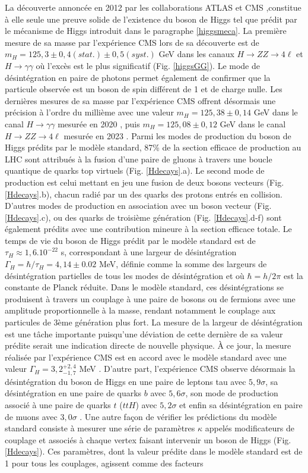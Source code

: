 La découverte annoncée en 2012 par les collaborations ATLAS et CMS \cite{CMSdiscovery,ATLASdiscovery},constitue à elle seule une preuve solide de l'existence du boson de Higgs tel que prédit par le mécanisme de Higgs introduit dans le paragraphe \ref{higgsmeca}. La première mesure de sa masse par l'expérience CMS lors de sa découverte est de $m_{H}=125,3\pm0,4(stat.)\pm0,5(syst.)$ GeV dans les canaux $H\rightarrow ZZ\rightarrow 4\ell$ et $H\rightarrow \gamma\gamma$ où l'excès est le plus significatif (Fig. \ref{higgsGG}). Le mode de désintégration en paire de photons permet également de confirmer que la particule observée est un boson de spin différent de 1 et de charge nulle. Les dernières mesures de sa masse par l'expérience CMS offrent désormais une précision à l'ordre du millième avec une valeur $m_{H}=125,38\pm0,14$ GeV dans le canal $H\to\gamma\gamma$ mesurée en 2020 \cite{HiggsMass2020}, puis $m_{H}=125,08\pm0,12$ GeV dans le canal $H\to ZZ\to 4\ell$ mesurée en 2023 \cite{HiggsMass2023}. Parmi les modes de production du boson de Higgs prédits par le modèle standard, 87\% de la section efficace de production au LHC sont attribués à la fusion d'une paire de gluons à travers une boucle quantique de quarks top virtuels (Fig. \ref{Hdecays}.a). Le second mode de production est celui mettant en jeu une fusion de deux bosons vecteurs (Fig. \ref{Hdecays}.b), chacun radié par un des quarks des protons entrés en collision. D'autres modes de production en association avec un boson vecteur (Fig. \ref{Hdecays}.c), ou des quarks de troisième génération (Fig. \ref{Hdecays}.d-f) sont également prédits avec une contribution mineure à la section efficace totale. Le temps de vie du boson de Higgs prédit par le modèle standard est de $\tau_H\approx1,6.10^{-22}$ s, correspondant à une largeur de désintégration $\Gamma_{H}=\hbar/\tau_{H}=4,14\pm0.02$ MeV, définie comme la somme des largeurs de désintégration partielles de tous les modes de désintégration et où $\hbar=h/2\pi$ est la constante de Planck réduite. Dans le modèle standard, ces désintégrations se produisent à travers un couplage à une paire de bosons ou de fermions avec une amplitude proportionnelle à la masse, rendant notamment le couplage aux particules de 3ème génération plus fort. La mesure de la largeur de désintégration est une tâche importante puisqu'une déviation de cette dernière de sa valeur prédite serait une indication directe de nouvelle physique. À ce jour, la mesure réalisée par l'expérience CMS est en accord avec le modèle standard avec une valeur $\Gamma_{H}=3,2^{+2,4}_{-1,7}$ MeV \cite{HiggsWidth2022}. D'autre part, l'expérience CMS observe désormais la désintégration du boson de Higgs en une paire de leptons tau avec $5,9\sigma$, sa désintégration en une paire de quarks $b$ avec $5,6\sigma$, son mode de production associé à une paire de quarks $t$ ($ttH$) avec $5,2\sigma$ et enfin sa désintégration en paire de muons avec $3,0\sigma$ \cite{higgs10years}. Une autre façon de vérifier les prédictions du modèle standard consiste à mesurer une série de paramètres $\kappa$ appelés modificateurs de couplage et associés à chaque vertex faisant intervenir un boson de Higgs (Fig. \ref{Hdecays}). Ces paramètres, dont la valeur prédite dans le modèle standard est de 1 pour tous les couplages, agissent comme des facteurs 